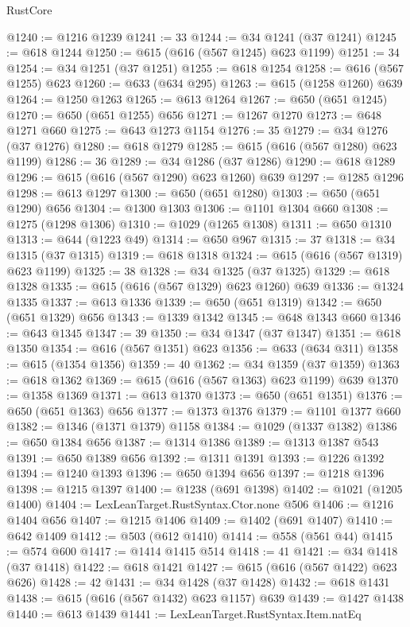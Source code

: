 \begin{lexlean}{RustCore}
\begin{coremodule}
@1240 := @1216 @1239
@1241 := 33
@1244 := @34 @1241 (@37 @1241)
@1245 := @618 @1244
@1250 := @615 (@616 (@567 @1245) @623 @1199)
@1251 := 34
@1254 := @34 @1251 (@37 @1251)
@1255 := @618 @1254
@1258 := @616 (@567 @1255) @623
@1260 := @633 (@634 @295)
@1263 := @615 (@1258 @1260) @639
@1264 := @1250 @1263
@1265 := @613 @1264
@1267 := @650 (@651 @1245)
@1270 := @650 (@651 @1255) @656
@1271 := @1267 @1270
@1273 := @648 @1271 @660
@1275 := @643 @1273 @1154
@1276 := 35
@1279 := @34 @1276 (@37 @1276)
@1280 := @618 @1279
@1285 := @615 (@616 (@567 @1280) @623 @1199)
@1286 := 36
@1289 := @34 @1286 (@37 @1286)
@1290 := @618 @1289
@1296 := @615 (@616 (@567 @1290) @623 @1260) @639
@1297 := @1285 @1296
@1298 := @613 @1297
@1300 := @650 (@651 @1280)
@1303 := @650 (@651 @1290) @656
@1304 := @1300 @1303
@1306 := @1101 @1304 @660
@1308 := @1275 (@1298 @1306)
@1310 := @1029 (@1265 @1308)
@1311 := @650 @1310
@1313 := @644 (@1223 @49)
@1314 := @650 @967
@1315 := 37
@1318 := @34 @1315 (@37 @1315)
@1319 := @618 @1318
@1324 := @615 (@616 (@567 @1319) @623 @1199)
@1325 := 38
@1328 := @34 @1325 (@37 @1325)
@1329 := @618 @1328
@1335 := @615 (@616 (@567 @1329) @623 @1260) @639
@1336 := @1324 @1335
@1337 := @613 @1336
@1339 := @650 (@651 @1319)
@1342 := @650 (@651 @1329) @656
@1343 := @1339 @1342
@1345 := @648 @1343 @660
@1346 := @643 @1345
@1347 := 39
@1350 := @34 @1347 (@37 @1347)
@1351 := @618 @1350
@1354 := @616 (@567 @1351) @623
@1356 := @633 (@634 @311)
@1358 := @615 (@1354 @1356)
@1359 := 40
@1362 := @34 @1359 (@37 @1359)
@1363 := @618 @1362
@1369 := @615 (@616 (@567 @1363) @623 @1199) @639
@1370 := @1358 @1369
@1371 := @613 @1370
@1373 := @650 (@651 @1351)
@1376 := @650 (@651 @1363) @656
@1377 := @1373 @1376
@1379 := @1101 @1377 @660
@1382 := @1346 (@1371 @1379) @1158
@1384 := @1029 (@1337 @1382)
@1386 := @650 @1384 @656
@1387 := @1314 @1386
@1389 := @1313 @1387 @543
@1391 := @650 @1389 @656
@1392 := @1311 @1391
@1393 := @1226 @1392
@1394 := @1240 @1393
@1396 := @650 @1394 @656
@1397 := @1218 @1396
@1398 := @1215 @1397
@1400 := @1238 (@691 @1398)
@1402 := @1021 (@1205 @1400)
@1404 := LexLeanTarget.RustSyntax.Ctor.none @506
@1406 := @1216 @1404 @656
@1407 := @1215 @1406
@1409 := @1402 (@691 @1407)
@1410 := @642 @1409
@1412 := @503 (@612 @1410)
@1414 := @558 (@561 @44)
@1415 := @574 @600
@1417 := @1414 @1415 @514
@1418 := 41
@1421 := @34 @1418 (@37 @1418)
@1422 := @618 @1421
@1427 := @615 (@616 (@567 @1422) @623 @626)
@1428 := 42
@1431 := @34 @1428 (@37 @1428)
@1432 := @618 @1431
@1438 := @615 (@616 (@567 @1432) @623 @1157) @639
@1439 := @1427 @1438
@1440 := @613 @1439
@1441 := LexLeanTarget.RustSyntax.Item.natEq

\end{coremodule}
\end{lexlean}
